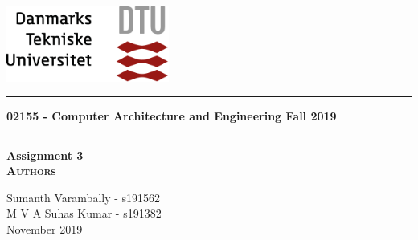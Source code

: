 
\begin{titlepage}
\begin{center}
\vspace{2cm}
\includegraphics[width=0.4\textwidth]{root/dtu.png}~\\[1cm]
\vspace{2cm}

\vspace{2cm}

\hrule
\vspace{.5cm}
    { \huge \bfseries 02155 - Computer Architecture and Engineering Fall 2019} %
\vspace{.5cm}

\hrule

\vspace{1.5cm}
{\bfseries Assignment 3}
\vspace{1.5cm}\\
\textsc{\textbf{Authors}}\\
\vspace{.5cm}
\centering

Sumanth Varambally - s191562\\
M V A Suhas Kumar - s191382\\

\vspace{2cm}
\vspace{2}
\centering November 2019 %
\end{center}
\end{titlepage}